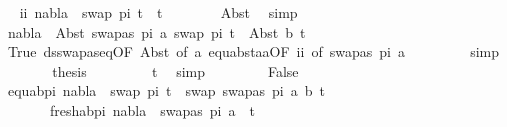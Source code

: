 \begin{isabellebody}
\ \isamarkupfalse%
\ ii{\isacharcolon}{\kern0pt}\ {\isachardoublequoteopen}nabla\ {\isasymturnstile}\ swap\ pi{}\ t{}{\isacharprime}{\kern0pt}\ {\isasymapprox}\ t{}{\isacharprime}{\kern0pt}{\isachardoublequoteclose}\isanewline
\ \ \ \ \ \ \isamarkupfalse%
\ Abst\ \isamarkupfalse%
\ simp\isanewline
\ \ \ \ \isamarkupfalse%
\ \isamarkupfalse%
\ {\isachardoublequoteopen}nabla\ {\isasymturnstile}\ Abst\ {\isacharparenleft}{\kern0pt}swapas\ pi{}\ a{\isacharparenright}{\kern0pt}\ {\isacharparenleft}{\kern0pt}swap\ pi{}\ t{}{\isacharprime}{\kern0pt}{\isacharparenright}{\kern0pt}\ {\isasymapprox}\ Abst\ b\ t{}{\isacharprime}{\kern0pt}{\isachardoublequoteclose}\isanewline
\ \ \ \ \ \ \isamarkupfalse%
\ True\ ds{\isacharunderscore}{\kern0pt}swapas{\isacharunderscore}{\kern0pt}eq{\isacharbrackleft}{\kern0pt}OF\ Abst{\isacharparenleft}{\kern0pt}{}{\isacharparenright}{\kern0pt}{\isacharcomma}{\kern0pt}\ of\ a{\isacharbrackright}{\kern0pt}\ equ{\isacharunderscore}{\kern0pt}abst{\isacharunderscore}{\kern0pt}aa{\isacharbrackleft}{\kern0pt}OF\ ii{\isacharcomma}{\kern0pt}\ of\ {\isacartoucheopen}swapas\ pi{}\ a{\isacartoucheclose}{\isacharbrackright}{\kern0pt}\ \isanewline
\ \ \ \ \ \ \isamarkupfalse%
\ simp\isanewline
\ \ \ \ \isamarkupfalse%
\ \isamarkupfalse%
\ {\isacharquery}{\kern0pt}thesis\ \isanewline
\ \ \ \ \ \ \isamarkupfalse%
\ t{}\ \isamarkupfalse%
\ simp\isanewline
\ \ \isamarkupfalse%
\isanewline
\ \ \ \ \isamarkupfalse%
\ False\isanewline
\ \ \ \ \isamarkupfalse%
\ \isamarkupfalse%
\ equ{\isacharunderscore}{\kern0pt}ab{\isacharunderscore}{\kern0pt}pi{}{\isacharcolon}{\kern0pt}\ {\isachardoublequoteopen}nabla\ {\isasymturnstile}\ swap\ pi{}\ t{}{\isacharprime}{\kern0pt}\ {\isasymapprox}\ swap\ {\isacharbrackleft}{\kern0pt}{\isacharparenleft}{\kern0pt}swapas\ pi{}\ a{\isacharcomma}{\kern0pt}\ b{\isacharparenright}{\kern0pt}{\isacharbrackright}{\kern0pt}\ t{}{\isacharprime}{\kern0pt}{\isachardoublequoteclose}\ \isanewline
\ \ \ \ \ \ \ fresh{\isacharunderscore}{\kern0pt}ab{\isacharunderscore}{\kern0pt}pi{}{\isacharcolon}{\kern0pt}\ {\isachardoublequoteopen}nabla\ {\isasymturnstile}\ swapas\ pi{}\ a\ {\isasymsharp}\ t{}{\isacharprime}{\kern0pt}{\isachardoublequoteclose}\isanewline

\end{isabellebody}
